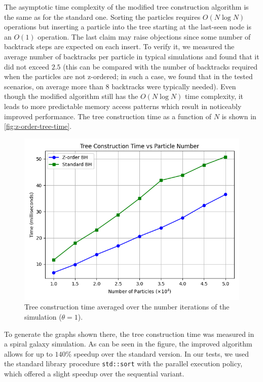 The asymptotic time complexity of the modified tree construction algorithm is the same as for the standard one.
Sorting the particles requires $O(N\log N)$ operations but inserting a particle into the tree starting at the last-seen node is an $O(1)$ operation.
The last claim may raise objections since some number of backtrack steps are expected on each insert.
To verify it, we measured the average number of backtracks per particle in typical simulations and found that it did not exceed $2.5$ (this can be compared with the number of backtracks required when the particles are not z-ordered; in such a case, we found that in the tested scenarios, on average more than 8 backtracks were typically needed).
Even though the modified algorithm still has the $O(N\log N)$ time complexity, it leads to more predictable memory access patterns which result in noticeably improved performance.
The tree construction time as a function of $N$ is shown in \autoref{fig:z-order-tree-time}.
\begin{figure}[htp]
    \centering
    \includegraphics[scale=0.5]{chapters/barnes-hut/img/tree_construction_time.png}
    \caption{Tree construction time averaged over the number iterations of the simulation ($\theta = 1$).}
    \label{fig:z-order-tree-time}
\end{figure}
To generate the graphs shown there, the tree construction time was measured in a spiral galaxy simulation.
As can be seen in the figure, the improved algorithm allows for up to $140\%$ speedup over the standard version.
In our tests, we used the standard library procedure \texttt{std::sort} with the parallel execution policy, which offered a slight speedup over the sequential variant.